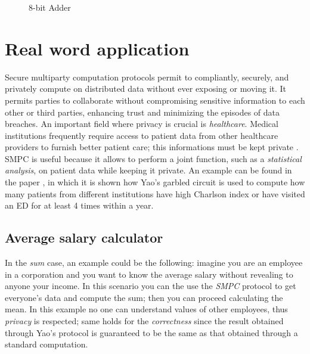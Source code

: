 \documentclass[12pt]{article}
\begin{document}
\begin{figure}[!h]
    \caption{8-bit Adder}\label{circuit}
\end{figure}

\section{Real word application}\label{sec:world}
Secure multiparty computation protocols permit to compliantly, securely, and privately compute on distributed data without ever exposing or moving it. It permits parties to collaborate without compromising sensitive information to each other or third parties, enhancing trust and minimizing the episodes of data breaches. An important field where privacy is crucial is \textit{healthcare}. Medical institutions frequently require access to patient data from other healthcare providers to furnish better patient care; this informations must be kept private \cite{application}. SMPC is useful because it allows to perform a joint function, such as a \textit{statistical analysis}, on patient data while keeping it private. An example can be found in the paper \cite{healthcare}, in which it is shown how Yao's garbled circuit is used to compute how many patients from different institutions have high Charlson index or have visited an ED for at least 4 times within a year.
\subsection{Average salary calculator}
In the \textit{sum} case, an example could be the following: imagine you are an employee in a corporation and you want to know the average salary without revealing to anyone your income. In this scenario you can the use the \textit{SMPC} protocol to get everyone's data and compute the sum; then you can proceed calculating the mean. In this example no one can understand values of other employees, thus \textit{privacy} is respected; same holds for the \textit{correctness} since the result obtained through Yao's protocol is guaranteed to be the same as that obtained through a standard computation.
\end{document}
